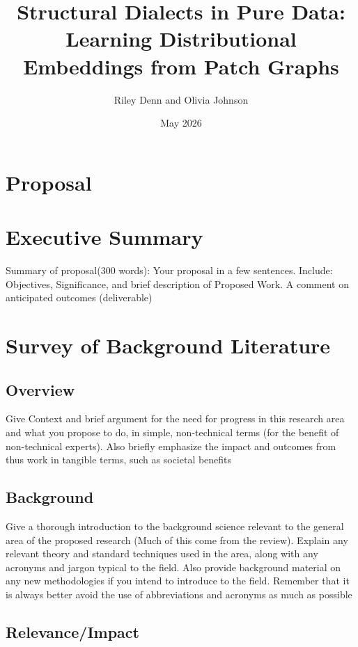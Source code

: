 \documentclass{article}
\title{Structural Dialects in Pure Data: Learning Distributional Embeddings from Patch Graphs}
\author{Riley Denn and Olivia Johnson }
\date{May 2026}
\begin{document}
\maketitle

\section*{Proposal}

\section{Executive Summary}

Summary of proposal(300 words): Your proposal in a few sentences. Include: Objectives, Significance, and brief description of Proposed Work. A comment on anticipated outcomes (deliverable)

\section{Survey of Background Literature}

\subsection{Overview}

Give Context and brief argument for the need for progress in this research area and what you propose to do, in simple, non-technical terms (for the benefit of non-technical experts). Also briefly emphasize the impact and outcomes from thus work in tangible terms, such as societal benefits


\subsection{Background}

Give a thorough introduction to the background science relevant to the general area of the proposed research (Much of this come from the review). Explain any relevant theory and standard techniques used in the area, along with any acronyms and jargon typical to the field. Also provide background material on any new methodologies if you intend to introduce to the field. Remember that it is always better avoid the use of abbreviations and acronyms as much as possible

\subsection{Relevance/Impact}
\end{document}
